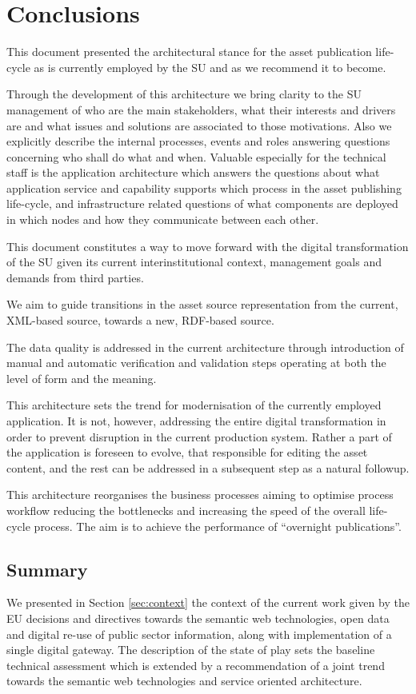 \chapter{Conclusions}
\label{sec:conclusions}
	
	This document presented the architectural stance for the asset publication life-cycle as is currently employed by the SU and as we recommend it to become.
	
	Through the development of this architecture we bring clarity to the SU management of who are the main stakeholders, what their interests and drivers are and what issues and solutions are associated to those motivations. Also we explicitly describe the internal processes, events and roles answering questions concerning who shall do what and when. Valuable especially for the technical staff is the application architecture which answers the questions about what application service and capability supports which process in the asset publishing life-cycle, and infrastructure related questions of what components are deployed in which nodes and how they communicate between each other. 
	
	This document constitutes a way to move forward with the digital transformation of the SU given its current interinstitutional context, management goals and demands from third parties.
	
	We aim to guide transitions in the asset source representation from the current, XML-based source, towards a new, RDF-based source. 
	
    The data quality is addressed in the current architecture through introduction of manual and automatic verification and validation steps operating at both the level of form and the meaning.
    
    This architecture sets the trend for modernisation of the currently employed application. It is not, however, addressing the entire digital transformation in order to prevent disruption in the current production system. Rather a part of the application is foreseen to evolve, that responsible for editing the asset content, and the rest can be addressed in a subsequent step as a natural followup.
	
	This architecture reorganises the business processes aiming to optimise process workflow reducing the bottlenecks and increasing the speed of the overall life-cycle process. The aim is to achieve the performance of ``overnight publications''. 

	\section{Summary}
	We presented in Section \ref{sec:context} the context of the current work given by the EU decisions and directives towards the semantic web technologies, open data and digital re-use of public sector information, along with implementation of a single digital gateway. The description of the state of play sets the baseline technical assessment which is extended by a recommendation of a joint trend towards the semantic web technologies and service oriented architecture.
	
